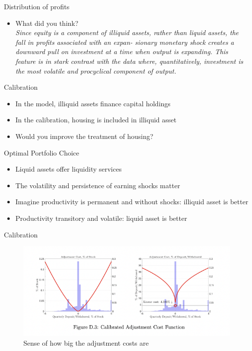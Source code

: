 \documentclass[english,xcolor=svgnames]{beamer}
\begin{document}
\begin{frame}{Distribution of profits}
\begin{itemize}
\item What did you think?\\
\pause
\textit{Since equity is a component of illiquid assets, rather than liquid assets, the fall in profits associated with an expan- sionary monetary shock creates a downward pull on investment at a time when output is expanding. This feature is in stark contrast with the data where, quantitatively, investment is the most volatile and procyclical component of output.}
\end{itemize}
\end{frame}

\begin{frame}{Calibration}
\begin{itemize}
\item In the model, illiquid assets finance capital holdings
\item In the calibration, housing is included in illiquid asset
\item Would you improve the treatment of housing?
\end{itemize}
\end{frame}


\begin{frame}{Optimal Portfolio Choice}
\begin{itemize}
\item Liquid assets offer liquidity services
\item The volatility and persistence of earning shocks matter
\item Imagine productivity is permanent and without shocks: illiquid asset is better
\item Productivity transitory and volatile: liquid asset is better
\end{itemize}
\end{frame}

\begin{frame}{Calibration}
\begin{figure}
\includegraphics[scale=0.5]{figures/kmv_1}\\
Sense of how big the adjustment costs are
\end{figure}
\end{frame}
\end{document}
